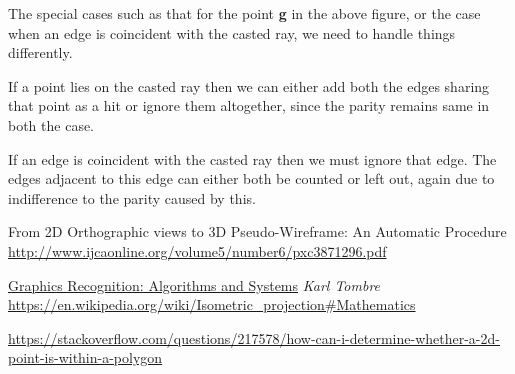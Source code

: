 \documentclass[a4paper,11pt,openany]{book}
\begin{document}
The special cases such as that for the point \textbf{g} in the above figure, or the case when an edge is coincident with the casted ray, we need to handle things differently.

If a point lies on the casted ray then we can either add both the edges sharing that point as a hit or ignore them altogether, since the parity remains same in both the case.

If an edge is coincident with the casted ray then we must ignore that edge. The edges adjacent to this edge can either both be counted or left out, again due to indifference to the parity caused by this.

\begin{thebibliography}{9}
From 2D Orthographic views to 3D Pseudo-Wireframe: An Automatic Procedure
\url{http://www.ijcaonline.org/volume5/number6/pxc3871296.pdf}

\href{https://books.google.co.in/books?id=zw-6_p9WUnIC&pg=PA284&lpg=PA284&dq=Removal+of+extra+edges+from+a+wireframe+algorithm&source=bl&ots=Njj7ljww6_&sig=eZoa8eT-TWU_4RVm0A1qTl6RrGk&hl=en&sa=X&ved=0ahUKEwij5JqzienYAhXBNI8KHVGOCZAQ6AEIKDAA#v=onepage&q=Removal}{Graphics Recognition: Algorithms and Systems}
\textit{Karl Tombre}
  \url{https://en.wikipedia.org/wiki/Isometric_projection#Mathematics}
  
\url{https://stackoverflow.com/questions/217578/how-can-i-determine-whether-a-2d-point-is-within-a-polygon}



\end{thebibliography}
\end{document}

